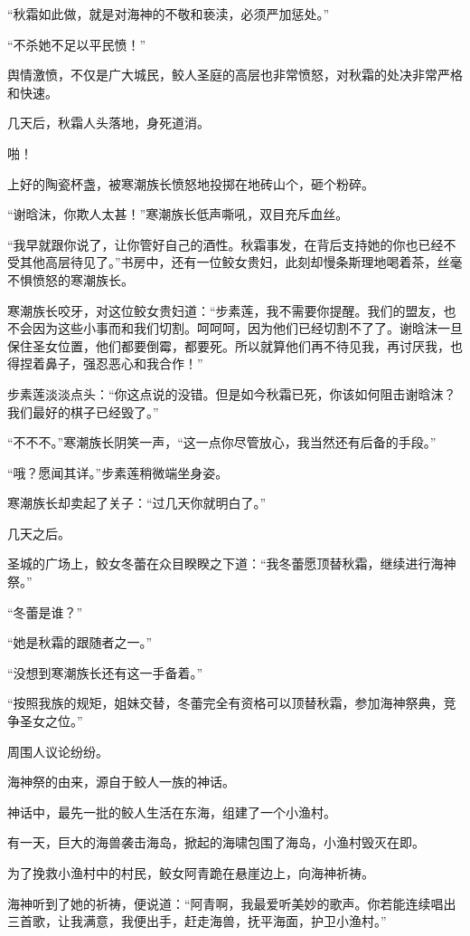 \begin{this_body}
“秋霜如此做，就是对海神的不敬和亵渎，必须严加惩处。”

“不杀她不足以平民愤！”

舆情激愤，不仅是广大城民，鲛人圣庭的高层也非常愤怒，对秋霜的处决非常严格和快速。

几天后，秋霜人头落地，身死道消。

啪！

上好的陶瓷杯盏，被寒潮族长愤怒地投掷在地砖山个，砸个粉碎。

“谢晗沫，你欺人太甚！”寒潮族长低声嘶吼，双目充斥血丝。

“我早就跟你说了，让你管好自己的酒性。秋霜事发，在背后支持她的你也已经不受其他高层待见了。”书房中，还有一位鲛女贵妇，此刻却慢条斯理地喝着茶，丝毫不惧愤怒的寒潮族长。

寒潮族长咬牙，对这位鲛女贵妇道：“步素莲，我不需要你提醒。我们的盟友，也不会因为这些小事而和我们切割。呵呵呵，因为他们已经切割不了了。谢晗沫一旦保住圣女位置，他们都要倒霉，都要死。所以就算他们再不待见我，再讨厌我，也得捏着鼻子，强忍恶心和我合作！”

步素莲淡淡点头：“你这点说的没错。但是如今秋霜已死，你该如何阻击谢晗沫？我们最好的棋子已经毁了。”

“不不不。”寒潮族长阴笑一声，“这一点你尽管放心，我当然还有后备的手段。”

“哦？愿闻其详。”步素莲稍微端坐身姿。

寒潮族长却卖起了关子：“过几天你就明白了。”

几天之后。

圣城的广场上，鲛女冬蕾在众目睽睽之下道：“我冬蕾愿顶替秋霜，继续进行海神祭。”

“冬蕾是谁？”

“她是秋霜的跟随者之一。”

“没想到寒潮族长还有这一手备着。”

“按照我族的规矩，姐妹交替，冬蕾完全有资格可以顶替秋霜，参加海神祭典，竞争圣女之位。”

周围人议论纷纷。

海神祭的由来，源自于鲛人一族的神话。

神话中，最先一批的鲛人生活在东海，组建了一个小渔村。

有一天，巨大的海兽袭击海岛，掀起的海啸包围了海岛，小渔村毁灭在即。

为了挽救小渔村中的村民，鲛女阿青跪在悬崖边上，向海神祈祷。

海神听到了她的祈祷，便说道：“阿青啊，我最爱听美妙的歌声。你若能连续唱出三首歌，让我满意，我便出手，赶走海兽，抚平海面，护卫小渔村。”


\end{this_body}
